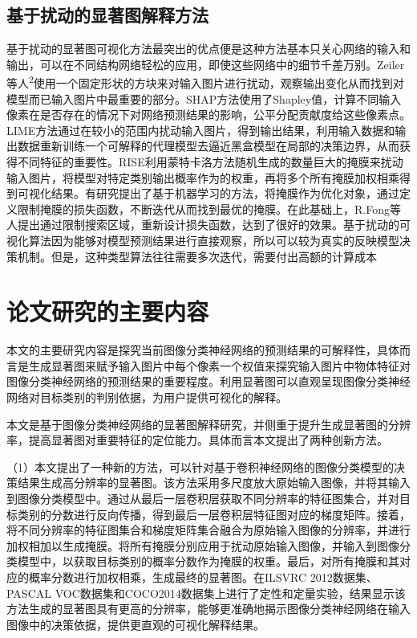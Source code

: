 \subsection{基于扰动的显著图解释方法}
基于扰动的显著图可视化方法最突出的优点便是这种方法基本只关心网络的输入和输出，可以在不同结构网络轻松的应用，即使这些网络中的细节千差万别。Zeiler等人\textsuperscript{\cite{zeiler2014visualizing}2}使用一个固定形状的方块来对输入图片进行扰动，观察输出变化从而找到对模型而已输入图片中最重要的部分。SHAP方法\textsuperscript{\cite{lundberg2017unified}}使用了Shapley值，计算不同输入像素在是否存在的情况下对网络预测结果的影响，公平分配贡献度给这些像素点。LIME\textsuperscript{\cite{ribeiro2016should}}方法通过在较小的范围内扰动输入图片，得到输出结果，利用输入数据和输出数据重新训练一个可解释的代理模型去逼近黑盒模型在局部的决策边界，从而获得不同特征的重要性。RISE\textsuperscript{\cite{petsiuk2018rise}}利用蒙特卡洛方法随机生成的数量巨大的掩膜来扰动输入图片，将模型对特定类别输出概率作为的权重，再将多个所有掩膜加权相乘得到可视化结果。有研究提出了基于机器学习的方法，将掩膜作为优化对象，通过定义限制掩膜的损失函数，不断迭代从而找到最优的掩膜。在此基础上，R.Fong等人\textsuperscript{\cite{fong2019understanding}\cite{fong2017interpretable}}提出通过限制搜索区域，重新设计损失函数，达到了很好的效果。基于扰动的可视化算法因为能够对模型预测结果进行直接观察，所以可以较为真实的反映模型决策机制。但是，这种类型算法往往需要多次迭代，需要付出高额的计算成本

\section{论文研究的主要内容}
本文的主要研究内容是探究当前图像分类神经网络的预测结果的可解释性，具体而言是生成显著图来赋予输入图片中每个像素一个权值来探究输入图片中物体特征对图像分类神经网络的预测结果的重要程度。利用显著图可以直观呈现图像分类神经网络对目标类别的判别依据，为用户提供可视化的解释。  

本文是基于图像分类神经网络的显著图解释研究，并侧重于提升生成显著图的分辨率，提高显著图对重要特征的定位能力。具体而言本文提出了两种创新方法。

（1）本文提出了一种新的方法，可以针对基于卷积神经网络的图像分类模型的决策结果生成高分辨率的显著图。该方法采用多尺度放大原始输入图像，并将其输入到图像分类模型中。通过从最后一层卷积层获取不同分辨率的特征图集合，并对目标类别的分数进行反向传播，得到最后一层卷积层特征图对应的梯度矩阵。接着，将不同分辨率的特征图集合和梯度矩阵集合融合为原始输入图像的分辨率，并进行加权相加以生成掩膜。将所有掩膜分别应用于扰动原始输入图像，并输入到图像分类模型中，以获取目标类别的概率分数作为掩膜的权重。最后，对所有掩膜和其对应的概率分数进行加权相乘，生成最终的显著图。在ILSVRC 2012数据集\textsuperscript{\cite{ILSVRC}}、PASCAL VOC数据集\textsuperscript{\cite{pascal}}和COCO2014数据集\textsuperscript{\cite{coco}}上进行了定性和定量实验，结果显示该方法生成的显著图具有更高的分辨率，能够更准确地揭示图像分类神经网络在输入图像中的决策依据，提供更直观的可视化解释结果。

